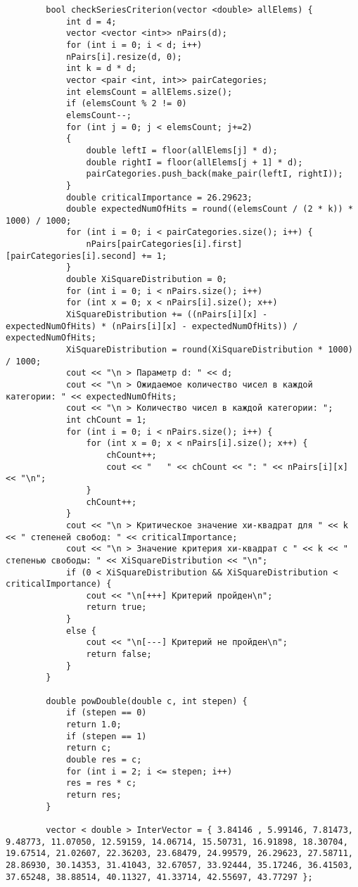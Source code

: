 \documentclass[bachelor, och, coursework]{shiza}
\begin{document}
\begin{verbatim}
		bool checkSeriesCriterion(vector <double> allElems) {
			int d = 4;
			vector <vector <int>> nPairs(d);
			for (int i = 0; i < d; i++)
			nPairs[i].resize(d, 0);
			int k = d * d;
			vector <pair <int, int>> pairCategories;
			int elemsCount = allElems.size();
			if (elemsCount % 2 != 0)
			elemsCount--;
			for (int j = 0; j < elemsCount; j+=2)
			{
				double leftI = floor(allElems[j] * d);
				double rightI = floor(allElems[j + 1] * d);
				pairCategories.push_back(make_pair(leftI, rightI));
			}
			double criticalImportance = 26.29623;
			double expectedNumOfHits = round((elemsCount / (2 * k)) * 1000) / 1000;
			for (int i = 0; i < pairCategories.size(); i++) {
				nPairs[pairCategories[i].first][pairCategories[i].second] += 1;
			}
			double XiSquareDistribution = 0;
			for (int i = 0; i < nPairs.size(); i++)
			for (int x = 0; x < nPairs[i].size(); x++)
			XiSquareDistribution += ((nPairs[i][x] - expectedNumOfHits) * (nPairs[i][x] - expectedNumOfHits)) / expectedNumOfHits;
			XiSquareDistribution = round(XiSquareDistribution * 1000) / 1000;
			cout << "\n > Параметр d: " << d;
			cout << "\n > Ожидаемое количество чисел в каждой категории: " << expectedNumOfHits;
			cout << "\n > Количество чисел в каждой категории: ";
			int chCount = 1;
			for (int i = 0; i < nPairs.size(); i++) {
				for (int x = 0; x < nPairs[i].size(); x++) {
					chCount++;
					cout << "   " << chCount << ": " << nPairs[i][x] << "\n";
				}
				chCount++;
			}
			cout << "\n > Критическое значение хи-квадрат для " << k << " степеней свобод: " << criticalImportance;
			cout << "\n > Значение критерия хи-квадрат с " << k << " степенью свободы: " << XiSquareDistribution << "\n";
			if (0 < XiSquareDistribution && XiSquareDistribution < criticalImportance) {
				cout << "\n[+++] Критерий пройден\n";
				return true;
			}
			else {
				cout << "\n[---] Критерий не пройден\n";
				return false;
			}
		}
		
		double powDouble(double c, int stepen) {
			if (stepen == 0)
			return 1.0;
			if (stepen == 1)
			return c;
			double res = c;
			for (int i = 2; i <= stepen; i++)
			res = res * c;
			return res;
		}
		
		vector < double > InterVector = { 3.84146 , 5.99146, 7.81473, 9.48773, 11.07050, 12.59159, 14.06714, 15.50731, 16.91898, 18.30704, 19.67514, 21.02607, 22.36203, 23.68479, 24.99579, 26.29623, 27.58711, 28.86930, 30.14353, 31.41043, 32.67057, 33.92444, 35.17246, 36.41503, 37.65248, 38.88514, 40.11327, 41.33714, 42.55697, 43.77297 };
		

\end{verbatim}
\end{document}
